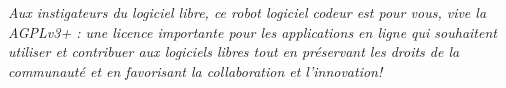 
\begin{flushright}
  \itshape
    Aux instigateurs du logiciel libre, ce robot logiciel codeur est pour vous, vive la AGPLv3+ : une licence importante pour les applications en ligne qui souhaitent utiliser et contribuer aux logiciels libres tout en préservant les droits de la communauté et en favorisant la collaboration et l'innovation!
\end{flushright}

